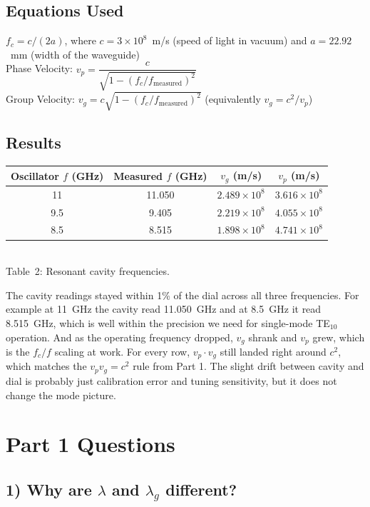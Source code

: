 \documentclass[11pt,letterpaper]{article}
\begin{document}
\subsection*{Equations Used}

$f_c = c/(2a)$, where $c = 3\times10^{8}$~m/s (speed of light in vacuum) and $a = 22.92$~mm (width of the waveguide)\\[2pt]
Phase Velocity: $v_p = \dfrac{c}{\sqrt{1 - (f_c/f_\text{measured})^2}}$\\[2pt]
Group Velocity: $v_g = c\sqrt{1 - (f_c/f_\text{measured})^2}$ \quad (equivalently $v_g = c^2/v_p$)

\subsection*{Results}

\begin{center}
\begin{tabular}{cccc}
\toprule
Oscillator $f$ (GHz) & Measured $f$ (GHz) & $v_g$ (m/s) & $v_p$ (m/s) \\
\midrule
11   & 11.050 & $2.489\times10^{8}$ & $3.616\times10^{8}$ \\
9.5  & 9.405  & $2.219\times10^{8}$ & $4.055\times10^{8}$ \\
8.5  & 8.515  & $1.898\times10^{8}$ & $4.741\times10^{8}$ \\
\bottomrule
\end{tabular}\\[4pt]
Table~2: Resonant cavity frequencies.
\end{center}

The cavity readings stayed within 1\% of the dial across all three frequencies. For example at 11~GHz the cavity read 11.050~GHz and at 8.5~GHz it read 8.515~GHz, which is well within the precision we need for single-mode TE$_{10}$ operation. And as the operating frequency dropped, $v_g$ shrank and $v_p$ grew, which is the $f_c/f$ scaling at work. For every row, $v_p \cdot v_g$ still landed right around $c^2$, which matches the $v_p v_g = c^2$ rule from Part 1. The slight drift between cavity and dial is probably just calibration error and tuning sensitivity, but it does not change the mode picture.

\newpage

\section{Part 1 Questions}

\subsection*{1) Why are $\lambda$ and $\lambda_g$ different?}
\end{document}
